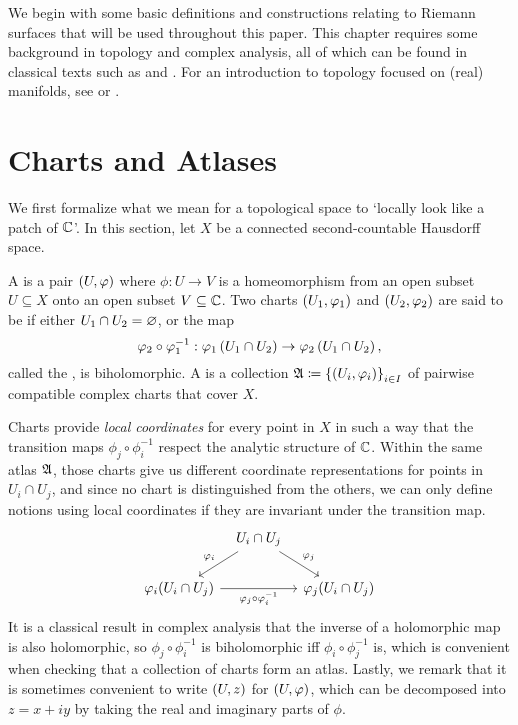 \documentclass[../Moduli_Spaces_of_Riemann_Surfaces.tex]{subfiles}
\begin{document}
    We begin with some basic definitions and constructions relating to Riemann surfaces that will be used throughout this paper. This chapter requires some background in topology and complex analysis, all of which can be found in classical texts such as \cite{munkres} and \cite{lang}. For an introduction to topology focused on (real) manifolds, see \cite{leeTM} or \cite{tu}.
    \section{Charts and Atlases}\label{sec:charts_and_atlases}
    We first formalize what we mean for a topological space to `locally look like a patch of $\C$'. In this section, let $X$ be a connected second-countable Hausdorff space.
    \begin{definition}
        A  is a pair $\tpl{U,\phi}$ where $\phi:U\to V$ is a homeomorphism from an open subset $U\subseteq X$ onto an open subset $V\subseteq\C$. Two charts $\l(U_1,\phi_1\r)$ and $\l(U_2,\phi_2\r)$ are said to be  if either $U_1\cap U_2=\em$, or the map
        \begin{equation*}
            \phi_2\circ\phi_1^{-1}:\phi_1\l(U_1\cap U_2\r)\to\phi_2\l(U_1\cap U_2\r),
        \end{equation*}
        called the , is biholomorphic. A  is a collection $\mf{A}\coloneqq\l\{\l(U_i,\phi_i\r)\r\}_{i\in I}$ of pairwise compatible complex charts that cover $X$.
    \end{definition}
    \begin{remark}
        Charts provide \textit{local coordinates} for every point in $X$ in such a way that the transition maps $\phi_j\circ\phi_i^{-1}$ respect the analytic structure of $\C$. Within the same atlas $\mf{A}$, those charts give us different coordinate representations for points in $U_i\cap U_j$, and since no chart is distinguished from the others, we can only define notions using local coordinates if they are invariant under the transition map.
        \begin{equation*}
            \begin{tikzcd}[column sep=0.1in]
                & U_i\cap U_j \ar[dl, "\phi_i"'] \ar[dr, "\phi_j"] \\
                \phi_i(U_i\cap U_j) \ar[rr, "\phi_j\circ\phi_i^{-1}"'] & & \phi_j(U_i\cap U_j)
            \end{tikzcd}
        \end{equation*}
        It is a classical result in complex analysis that the inverse of a holomorphic map is also holomorphic, so $\phi_j\circ\phi_i^{-1}$ is biholomorphic iff $\phi_i\circ\phi_j^{-1}$ is, which is convenient when checking that a collection of charts form an atlas. Lastly, we remark that it is sometimes convenient to write $\tpl{U,z}$ for $\tpl{U,\phi}$, which can be decomposed into $z=x+iy$ by taking the real and imaginary parts of $\phi$.\exqed
    \end{remark}
\end{document}
